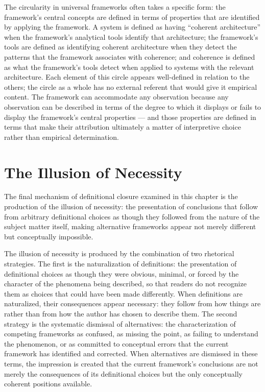 \documentclass[12pt, openright, twoside]{book}
\begin{document}
The circularity in universal frameworks often takes a
specific form: the framework's central concepts are defined
in terms of properties that are identified by applying
the framework. A system is defined as having ``coherent
architecture'' when the framework's analytical tools
identify that architecture; the framework's tools are
defined as identifying coherent architecture when they
detect the patterns that the framework associates with
coherence; and coherence is defined as what the framework's
tools detect when applied to systems with the relevant
architecture. Each element of this circle appears well-defined
in relation to the others; the circle as a whole has no
external referent that would give it empirical content.
The framework can accommodate any observation because
any observation can be described in terms of the degree
to which it displays or fails to display the framework's
central properties --- and those properties are defined
in terms that make their attribution ultimately a matter
of interpretive choice rather than empirical determination.

\section{The Illusion of Necessity}

The final mechanism of definitional closure examined in
this chapter is the production of the illusion of necessity:
the presentation of conclusions that follow from arbitrary
definitional choices as though they followed from the
nature of the subject matter itself, making alternative
frameworks appear not merely different but conceptually
impossible.

The illusion of necessity is produced by the combination
of two rhetorical strategies. The first is the naturalization
of definitions: the presentation of definitional choices
as though they were obvious, minimal, or forced by the
character of the phenomena being described, so that readers
do not recognize them as choices that could have been made
differently. When definitions are naturalized, their
consequences appear necessary: they follow from how things
are rather than from how the author has chosen to describe
them. The second strategy is the systematic dismissal of
alternatives: the characterization of competing frameworks
as confused, as missing the point, as failing to understand
the phenomenon, or as committed to conceptual errors that
the current framework has identified and corrected. When
alternatives are dismissed in these terms, the impression
is created that the current framework's conclusions are
not merely the consequences of its definitional choices
but the only conceptually coherent positions available.
\end{document}
